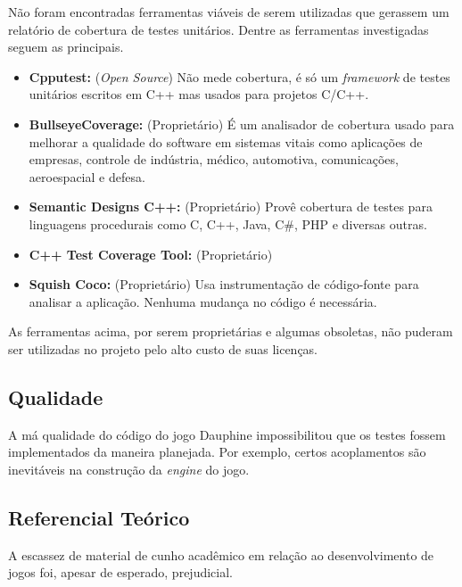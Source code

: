 Não foram encontradas ferramentas viáveis de serem utilizadas que gerassem um relatório de cobertura de testes unitários. Dentre as ferramentas investigadas seguem as principais.

\begin{itemize}
\item \textbf{Cpputest:} (\textit{Open Source}) Não mede cobertura, é só um \textit{framework} de testes unitários escritos em C++ mas usados para projetos C/C++.
\item \textbf{BullseyeCoverage:} (Proprietário) É um analisador de cobertura usado para melhorar a qualidade do software em sistemas vitais como aplicações de empresas, controle de indústria, médico, automotiva, comunicações, aeroespacial e defesa.
\item \textbf{Semantic Designs C++:}  (Proprietário) Provê cobertura de testes para linguagens procedurais como C, C++, Java, C\#, PHP e diversas outras.
\item \textbf{C++ Test Coverage Tool:}  (Proprietário)
\item \textbf{Squish Coco:} (Proprietário) Usa instrumentação de código-fonte para analisar a aplicação. Nenhuma mudança no código é necessária.
\end{itemize}

As ferramentas acima, por serem proprietárias e algumas obsoletas, não puderam ser utilizadas no projeto pelo alto custo de suas licenças.

\subsection {Qualidade}
A má qualidade do código do jogo Dauphine impossibilitou que os testes fossem implementados da maneira planejada. Por exemplo, certos acoplamentos são inevitáveis na construção da \textit{engine} do jogo.
\subsection {Referencial Teórico}
A escassez de material de cunho acadêmico em relação ao desenvolvimento de jogos foi, apesar de esperado, prejudicial.

